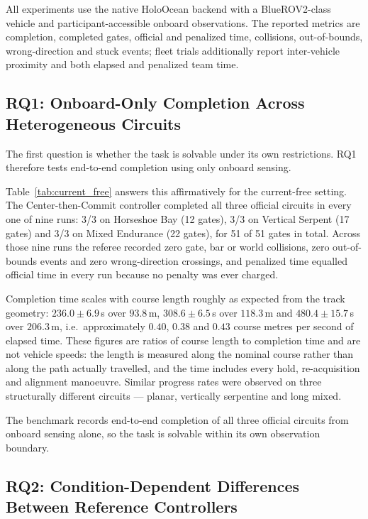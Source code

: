 All experiments use the native HoloOcean backend with a BlueROV2-class vehicle
and participant-accessible onboard observations. The reported metrics are
completion, completed gates, official and penalized time, collisions,
out-of-bounds, wrong-direction and stuck events; fleet trials additionally report
inter-vehicle proximity and both elapsed and penalized team time.

\subsection{RQ1: Onboard-Only Completion Across Heterogeneous Circuits}
\label{sec:eval_rq1}

The first question is whether the task is solvable under its own restrictions.
RQ1 therefore tests end-to-end completion using only onboard sensing.

Table~\ref{tab:current_free} answers this affirmatively for the current-free
setting. The Center-then-Commit controller completed all
three official circuits in every one of nine runs: 3/3 on Horseshoe Bay (12
gates), 3/3 on Vertical Serpent (17 gates) and 3/3 on Mixed Endurance (22 gates),
for 51 of 51 gates in total. Across those nine runs the referee recorded zero
gate, bar or world collisions, zero out-of-bounds events and zero
wrong-direction crossings, and penalized time equalled official time in every
run because no penalty was ever charged.



Completion time scales with course length roughly as expected from the track
geometry: $236.0\pm6.9$\,s over $93.8$\,m, $308.6\pm6.5$\,s over $118.3$\,m and
$480.4\pm15.7$\,s over $206.3$\,m, i.e.\ approximately $0.40$, $0.38$ and
$0.43$ course metres per second of elapsed time. These figures are ratios of
course length to completion time and are not vehicle speeds: the length is
measured along the nominal course rather than along the path actually travelled,
and the time includes every hold, re-acquisition and alignment manoeuvre.
Similar progress rates were observed on three structurally different
circuits --- planar, vertically serpentine and long mixed.

The benchmark records end-to-end completion of all three official circuits from
onboard sensing alone, so the task is solvable within its own observation
boundary.

\subsection{RQ2: Condition-Dependent Differences Between Reference Controllers}
\label{sec:eval_rq2}

